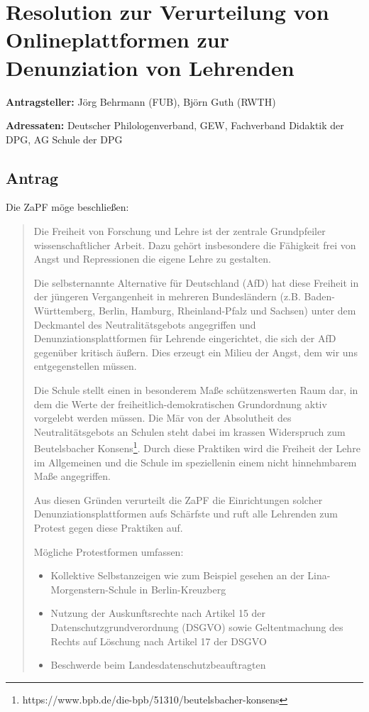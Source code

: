 \documentclass[draft,10pt,oneside]{scrartcl}
\begin{document}
\section*{Resolution zur Verurteilung von Onlineplattformen zur Denunziation
von Lehrenden}

\textbf{Antragsteller:} Jörg Behrmann (FUB), Björn Guth (RWTH)

\textbf{Adressaten:} Deutscher Philologenverband, GEW, Fachverband Didaktik der
DPG, AG Schule der DPG

\subsection*{Antrag}

Die ZaPF möge beschließen:

\begin{quote} Die Freiheit von Forschung und Lehre ist der zentrale
    Grundpfeiler wissenschaftlicher Arbeit. Dazu gehört insbesondere die
    Fähigkeit frei von Angst und Repressionen die eigene Lehre zu gestalten.

    Die selbsternannte \glqq{}Alternative für Deutschland\grqq{} (AfD) hat diese
    Freiheit in der jüngeren Vergangenheit in mehreren Bundesländern
    (z.B. Ba\-den-\allowbreak Würt\-tem\-berg, Berlin, Hamburg, Rheinland-Pfalz
    und Sachsen) unter dem Deckmantel des Neutralitätsgebots angegriffen und
    Denunziationsplattformen für Lehrende eingerichtet, die sich der AfD
    gegenüber kritisch äußern. Dies erzeugt ein Milieu der Angst, dem wir uns
    entgegenstellen müssen.

    Die Schule stellt einen in besonderem Maße schützenswerten Raum dar, in dem
    die Werte der freiheitlich-demokratischen Grundordnung aktiv vorgelebt
    werden müssen.  Die Mär von der Absolutheit des Neutralitätsgebots an
    Schulen steht dabei im krassen Widerspruch zum Beutelsbacher
    Konsens\footnote{https://www.bpb.de/die-bpb/51310/beutelsbacher-konsens}.
    Durch diese Praktiken wird die Freiheit der Lehre im Allgemeinen und die
    Schule im speziellenin einem nicht hinnehmbarem Maße angegriffen.

    Aus diesen Gründen verurteilt die ZaPF die Einrichtungen solcher
    Denunziationsplattformen aufs Schärfste und ruft alle Lehrenden zum Protest
    gegen diese Praktiken auf.

    Mögliche Protestformen umfassen:

    \begin{itemize}
        \item Kollektive Selbstanzeigen wie zum Beispiel gesehen an der
            Lina-\allowbreak Morgenstern-\allowbreak Schule in
            Ber\-lin-\allowbreak Kreuz\-berg
        \item Nutzung der Auskunftsrechte nach Artikel 15 der
            Datenschutzgrundverordnung (DSGVO) sowie Geltentmachung des Rechts
            auf Löschung nach Artikel 17 der DSGVO
        \item Beschwerde beim Landesdatenschutzbeauftragten
    \end{itemize}
\end{quote}
\end{document}
